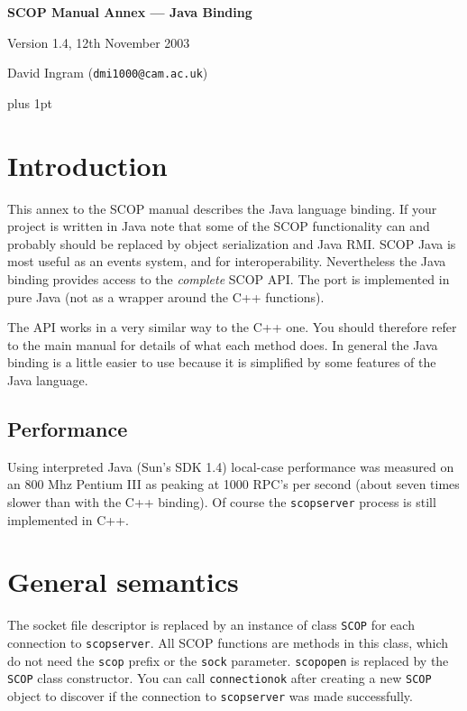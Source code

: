 \documentclass[12pt,a4paper,twoside]{article}
\renewcommand{\_}{\texttt{\symbol{95}}}
\begin{document}
\centerline{\textbf{\LARGE SCOP Manual Annex --- Java Binding}}
\vspace{0.5cm}
\centerline{Version 1.4, 12th November 2003}
\centerline{David Ingram (\texttt{dmi1000@cam.ac.uk})}

{ \parskip 1mm plus 1pt \tableofcontents }

\section{Introduction}

This annex to the SCOP manual describes the Java language binding. If
your project is written in Java note that some of the SCOP
functionality can and probably should be replaced by object
serialization and Java RMI. SCOP Java is most useful as an events
system, and for interoperability. Nevertheless the Java binding
provides access to the \textit{complete} SCOP API. The port is
implemented in pure Java (not as a wrapper around the C++ functions).

The API works in a very similar way to the C++ one. You should
therefore refer to the main manual for details of what each method
does. In general the Java binding is a little easier to use because
it is simplified by some features of the Java language.

\subsection{Performance}

Using interpreted Java (Sun's SDK 1.4) local-case performance was
measured on an 800 Mhz Pentium III as peaking at 1000 RPC's per second
(about seven times slower than with the C++ binding). Of course the
\texttt{scopserver} process is still implemented in C++.

\section{General semantics}

The socket file descriptor is replaced by an instance of class
\texttt{SCOP} for each connection to \texttt{scopserver}. All SCOP
functions are methods in this class, which do not need the
\texttt{scop\_} prefix or the \texttt{sock} parameter.
\texttt{scop\_open} is replaced by the \texttt{SCOP} class
constructor. You can call \texttt{connection\_ok} after creating
a new \texttt{SCOP} object to discover if the connection to
\texttt{scopserver} was made successfully.
\end{document}
